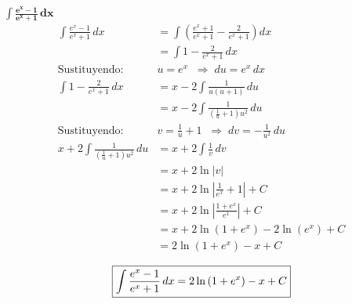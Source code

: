 $\displaystyle \mathbf{ \int 
        \frac{e^{x} - 1}{e^{x} + 1}
    \,dx}$ 
\nopagebreak
\begin{align*}
\int \frac{e^{x} - 1}{e^{x} + 1}\, dx
&= \int \left(\frac{e^{x} + 1}{e^{x} + 1} - \frac{2}{e^{x} + 1}\right) dx \\[6pt]
&= \int 1 - \frac{2}{e^{x} + 1}\, dx\\[6pt]
\text{Sustituyendo: } &u = e^{x} 
\;\;\Rightarrow\; du = e^{x}\, dx\\[6pt]
\int 1 - \frac{2}{e^{x} + 1}\, dx
&= x - 2\int \frac{1}{u \left(u + 1\right)} \, du \\[6pt]
&= x - 2\int \frac{1}{\left(\frac{1}{u} + 1\right) u^{2}} \, du \\[6pt]
\text{Sustituyendo: } &v = \frac{1}{u} + 1
\;\;\Rightarrow\; dv = -\frac{1}{u^{2}}\, du\\[6pt]
x+ 2\int \frac{1}{\left(\frac{1}{u} + 1\right) u^{2}} \, du
&= x + 2\int \frac{1}{v} \, dv \\[6pt]
&= x+2\ln\left|v\right|\\[6pt]
&= x+2\ln\left|\frac{1}{e^{x}}+1\right|+ C\\[6pt]
&= x+2\ln\left|\frac{1+e^{x}}{e^{x}}\right|+ C\\[6pt]
&= x+2\ln\left(1+e^{x}\right)- 2 \ln\left(e^{x}\right)+ C\\[6pt]
&= 2\ln\left(1+e^{x}\right)- x + C\\[6pt]
\end{align*}
\[
\boxed{\displaystyle \int
    \frac{e^{x} - 1}{e^{x} + 1}\,dx 
    = 2 \ln\left(1+e^{x}\right)- x + C\\[6pt]
}
\]  